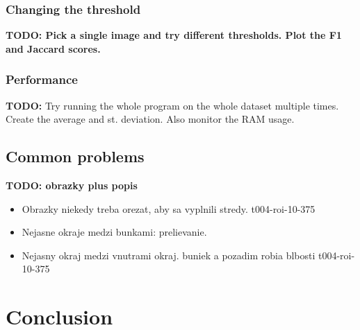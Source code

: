 \documentclass[
  digital,     %
  oneside,     %
  nosansbold,  %
  nocolorbold, %
  lof,         %
  lot,         %
]{fithesis4}
\begin{document}
\subsection{Changing the threshold}

\textbf{TODO: Pick a single image and try different thresholds. Plot the F1 and
Jaccard scores.}

\subsection{Performance}

\textbf{TODO:} Try running the whole program on the whole dataset multiple
times. Create the average and st. deviation. Also monitor the RAM usage.

\section{Common problems}

\textbf{TODO: obrazky plus popis}
\begin{itemize}
    \item Obrazky niekedy treba orezat, aby sa vyplnili stredy. t004-roi-10-375
    \item Nejasne okraje medzi bunkami: prelievanie. 
    \item Nejasny okraj medzi vnutrami okraj. buniek a pozadim robia blbosti t004-roi-10-375
\end{itemize}

\chapter{Conclusion}
\end{document}
